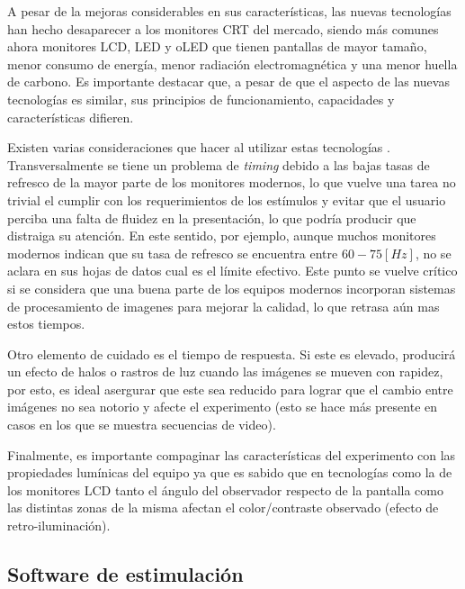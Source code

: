 \documentclass[../main.tex]{subfiles}
\begin{document}
			A pesar de la mejoras considerables en sus características, las nuevas tecnologías han hecho desaparecer a los monitores CRT del mercado, siendo más comunes ahora monitores LCD, LED y oLED que tienen pantallas de mayor tamaño, menor consumo de energía, menor radiación electromagnética y una menor huella de carbono. Es importante destacar que, a pesar de que el aspecto de las nuevas tecnologías es similar, sus principios de funcionamiento, capacidades y características difieren.

			Existen varias consideraciones que hacer al utilizar estas tecnologías \cite{article:monitor_wang, article:monitor_elze}. Transversalmente se tiene un problema de \textit{timing} debido a las bajas tasas de refresco de la mayor parte de los monitores modernos, lo que vuelve una tarea no trivial el cumplir con los requerimientos de los estímulos y evitar que el usuario perciba una falta de fluidez en la presentación, lo que podría producir que distraiga su atención. En este sentido, por ejemplo, aunque muchos monitores modernos indican que su tasa de refresco se encuentra entre $60-75[Hz]$, no se aclara en sus hojas de datos cual es el límite efectivo. Este punto se vuelve crítico si se considera que una buena parte de los equipos modernos incorporan sistemas de procesamiento de imagenes para mejorar la calidad, lo que retrasa aún mas estos tiempos. 

			Otro elemento de cuidado es el tiempo de respuesta. Si este es elevado, producirá un efecto de halos o rastros de luz cuando las imágenes se mueven con rapidez, por esto, es ideal asergurar que este sea reducido para lograr que el cambio entre imágenes no sea notorio y afecte el experimento (esto se hace más presente en casos en los que se muestra secuencias de video). 

			Finalmente, es importante compaginar las características del experimento con las propiedades lumínicas del equipo ya que es sabido que en tecnologías como la de los monitores LCD tanto el ángulo del observador respecto de la pantalla como las distintas zonas de la misma afectan el color/contraste observado (efecto de retro-iluminación). 
			
		\subsection{Software de estimulación}
		\label{sub:02_software_de_estimulacion}
\end{document}
